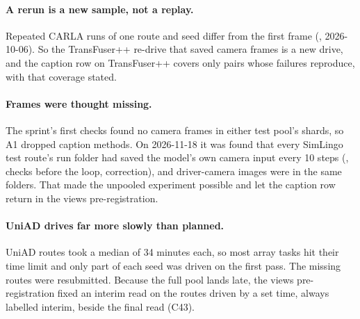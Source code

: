 \paragraph{A rerun is a new sample, not a replay.}
Repeated CARLA runs of one route and seed differ from the first frame
(, 2026-10-06). So the TransFuser++ re-drive that saved
camera frames is a new drive, and the caption row on TransFuser++ covers only
pairs whose failures reproduce, with that coverage stated.

\paragraph{Frames were thought missing.}
The sprint's first checks found no camera frames in either test pool's shards,
so A1 dropped caption methods. On 2026-11-18 it was found that every SimLingo
test route's run folder had saved the model's own camera input every 10 steps
(, checks before the loop, correction), and driver-camera
images were in the same folders. That made the unpooled experiment possible and
let the caption row return in the views pre-registration.

\paragraph{UniAD drives far more slowly than planned.}
UniAD routes took a median of 34 minutes each, so most array tasks hit their time
limit and only part of each seed was driven on the first pass. The missing
routes were resubmitted. Because the full pool lands late, the views
pre-registration fixed an interim read on the routes driven by a set time, always
labelled interim, beside the final read (C43).
